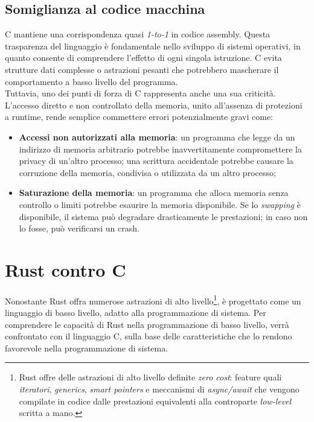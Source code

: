 \subsection*{Somiglianza al codice macchina}
C mantiene una corrispondenza quasi \textit{1-to-1} in codice assembly. 
Questa trasparenza del linguaggio è fondamentale nello sviluppo di 
sistemi operativi, in quanto consente di comprendere l'effetto di ogni singola istruzione. 
C evita strutture dati complesse o astrazioni pesanti che potrebbero mascherare
il comportamento a basso livello del programma.\hfill
\vspace{30pt}\\
\noindent Tuttavia, uno dei punti di forza di C rappresenta anche una sua criticità. 
L'accesso diretto e non controllato della memoria, unito all'assenza di protezioni a runtime, rende semplice
commettere errori potenzialmente gravi come:
\begin{itemize}
    \item \textbf{Accessi non autorizzati alla memoria}: un programma che legge da un indirizzo di memoria arbitrario potrebbe inavvertitamente compromettere la privacy di un'altro processo; una scrittura accidentale potrebbe causare la corruzione della memoria, condivisa o utilizzata da un altro processo;
    \item \textbf{Saturazione della memoria}: un programma che alloca memoria senza controllo o limiti potrebbe esaurire la memoria disponibile. Se lo \textit{swapping} è disponibile, il sistema può degradare drasticamente le prestazioni; in caso non lo fosse, può verificarsi un crash.
\end{itemize}

\section{Rust contro C}
Nonostante Rust offra numerose astrazioni di alto livello\footnote{Rust offre delle astrazioni di alto livello definite \textit{zero cost}: feature quali \textit{iteratori}, \textit{generics}, \textit{smart pointers} e meccanismi di \textit{async/await} che vengono compilate in codice dalle prestazioni equivalenti alla controparte \textit{low-level} scritta a mano.}, è progettato come un linguaggio di basso livello, 
adatto alla programmazione di sistema.
Per comprendere le capacità di Rust nella programmazione di basso livello, verrà confrontato con il linguaggio C, sulla 
base delle caratteristiche che lo rendono favorevole nella programmazione di sistema.

